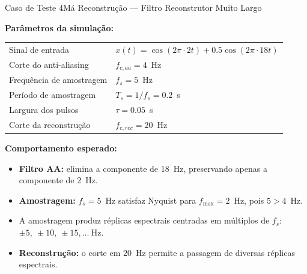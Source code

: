 \begin{frame}{Caso de Teste 4}{Má Reconstrução — Filtro Reconstrutor Muito Largo}
	\small
	
	\textbf{Parâmetros da simulação:}
	
	\begin{center}
		\begin{tabular}{ll}
			\hline
			Sinal de entrada & $x(t)=\cos(2\pi\cdot2t)+0.5\cos(2\pi\cdot18t)$ \\
			Corte do anti-aliasing & $f_{c,aa}=4$~Hz \\
			Frequência de amostragem & $f_s=5$~Hz \\
			Período de amostragem & $T_s=1/f_s=0.2$~s \\
			Largura dos pulsos & $\tau=0.05$~s \\
			Corte da reconstrução & $f_{c,rec}=20$~Hz \\
			\hline
		\end{tabular}
	\end{center}
	
	\vspace{0.5em}
	
	\textbf{Comportamento esperado:}
	
	\begin{itemize}
		\item \textbf{Filtro AA:} elimina a componente de 18~Hz, preservando apenas a componente de 2~Hz.
		\item \textbf{Amostragem:} $f_s=5$~Hz satisfaz Nyquist para $f_{\max}=2$~Hz, pois
		$5>4$~Hz.
		\item A amostragem produz réplicas espectrais centradas em múltiplos de $f_s$: $\pm5,\ \pm10,\ \pm15,\ldots~\text{Hz}$.
		\item \textbf{Reconstrução:} o corte em $20$~Hz permite a passagem de diversas réplicas espectrais. 
	\end{itemize}
	
\end{frame}


